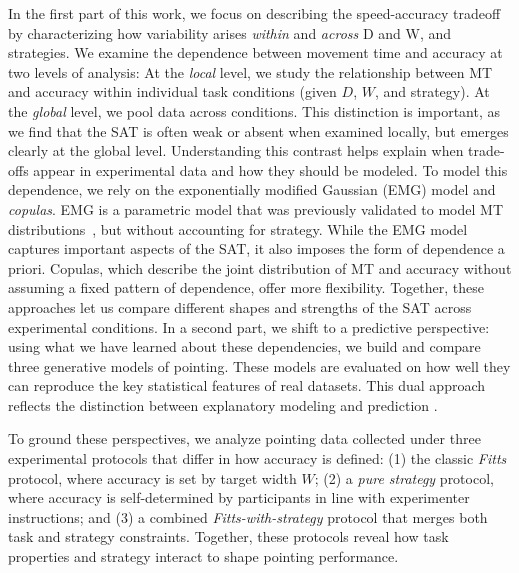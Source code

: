 \documentclass[acmlarge, manuscript,review]{acmart}
\begin{document}
In the first part of this work, we focus on describing the speed-accuracy tradeoff by characterizing how variability arises \textit{within} and \textit{across} D and W, and strategies. 
We examine the dependence between movement time and accuracy at two levels of analysis: At the \emph{local} level, we study the relationship between MT and accuracy within individual task conditions (given $D$, $W$, and strategy). 
At the \emph{global} level, we pool data across conditions. 
This distinction is important, as we find that the SAT is often weak or absent when examined locally, but emerges clearly at the global level. 
Understanding this contrast helps explain when trade-offs appear in experimental data and how they should be modeled.
To model this dependence, we rely on the exponentially modified Gaussian (EMG) model and \textit{copulas}. EMG is a parametric model that was previously validated to model MT distributions~\cite{gori2019,gori2018these,li2024,zhao2022}, but without accounting for strategy. While the EMG model captures important aspects of the SAT, it also imposes the form of dependence a priori.
Copulas, which describe the joint distribution of MT and accuracy without assuming a fixed pattern of dependence, offer more flexibility. 
Together, these approaches let us compare different shapes and strengths of the SAT across experimental conditions.
In a second part, we shift to a predictive perspective: using what we have learned about these dependencies, we build and compare three generative models of pointing.
These models are evaluated on how well they can reproduce the key statistical features of real datasets.
This dual approach reflects the distinction between explanatory modeling and prediction \cite{shmueli2010}.



To ground these perspectives, we analyze pointing data collected under three experimental protocols that differ in how accuracy is defined: 
(1) the classic \emph{Fitts} protocol, where accuracy is set by target width $W$; 
(2) a \emph{pure strategy} protocol, where accuracy is self-determined by participants in line with experimenter instructions; and 
(3) a combined \emph{Fitts-with-strategy} protocol that merges both task and strategy constraints. 
Together, these protocols reveal how task properties and strategy interact to shape pointing performance.
\end{document}
